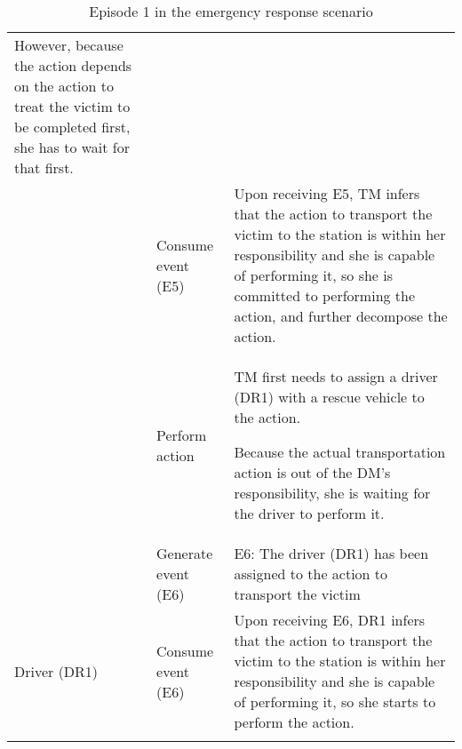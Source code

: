 {\begin{longtable}{>{\raggedright}p{1.2in}>{\raggedright}p{1.2in}>{\raggedright}p{3in}}
However, because the action depends on the action to treat the victim
to be completed first, she has to wait for that first.\tabularnewline
\cmidrule{2-3} 
 & Consume event (E5) & Upon receiving E5, TM infers that the action to transport the victim
to the station is within her responsibility and she is capable of
performing it, so she is committed to performing the action, and further
decompose the action.\tabularnewline
\cmidrule{2-3} 
 & Perform action & TM first needs to assign a driver (DR1) with a rescue vehicle to the
action.

Because the actual transportation action is out of the DM's responsibility,
she is waiting for the driver to perform it.\tabularnewline
\cmidrule{2-3} 
 & Generate event (E6) & E6: The driver (DR1) has been assigned to the action to transport
the victim \tabularnewline
\midrule 
Driver (DR1) & Consume event (E6) & Upon receiving E6, DR1 infers that the action to transport the victim
to the station is within her responsibility and she is capable of
performing it, so she starts to perform the action.\tabularnewline
\bottomrule
\caption{Episode 1 in the emergency response scenario}
\label{tab:episode_1_appendix}

\end{longtable}
}


